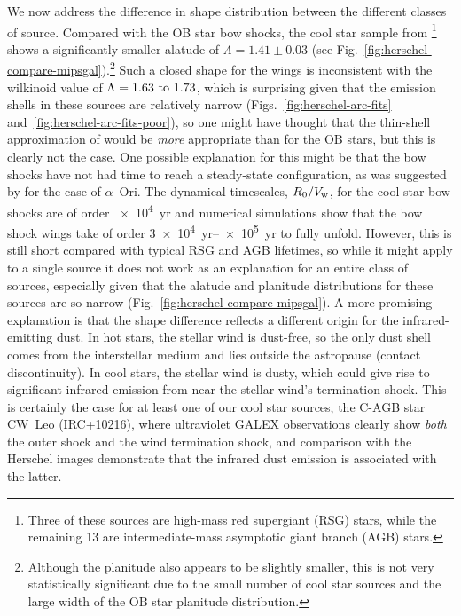 We now address the difference in shape distribution between the
different classes of source.  Compared with the OB star bow shocks,
the cool star sample from \citet{Cox:2012a}\footnote{Three of these
  sources are high-mass red supergiant (RSG) stars, while the
  remaining 13 are intermediate-mass asymptotic giant branch (AGB)
  stars.} shows a significantly smaller alatude of
\(\Lambda = 1.41 \pm 0.03\) (see
Fig.~\ref{fig:herschel-compare-mipsgal}).\footnote{Although the
  planitude also appears to be slightly smaller, this is not very
  statistically significant due to the small number of cool star
  sources and the large width of the OB star planitude distribution.}
Such a closed shape for the wings is inconsistent with the wilkinoid
value of \(\Lambda = \text{\numrange{1.63}{1.73}}\), which is surprising
given that the emission shells in these sources are relatively narrow
(Figs.~\ref{fig:herschel-arc-fits}
and~\ref{fig:herschel-arc-fits-poor}), so one might have thought that
the thin-shell approximation of \citet{Wilkin:1996a} would be
\emph{more} appropriate than for the OB stars, but this is clearly not
the case.  One possible explanation for this might be that the bow
shocks have not had time to reach a steady-state configuration, as was
suggested by \citet{Mohamed:2012a} for the case of \(\alpha\)~Ori.  The
dynamical timescales, \(R_0 / V_{\text{w}}\), for the cool star bow shocks
are of order \SI{e4}{yr} and numerical simulations \citetext{e.g.,
  Fig.~11 of \citealp{Mohamed:2012a} and Fig.~2 of
  \citealp{van-Marle:2014a}} show that the bow shock wings take of
order \SIrange{3e4}{e5}{yr} to fully unfold.  However, this is still
short compared with typical RSG and AGB lifetimes, so while it might
apply to a single source it does not work as an explanation for an
entire class of sources, especially given that the alatude and
planitude distributions for these sources are so narrow
(Fig.~\ref{fig:herschel-compare-mipsgal}).  A more promising
explanation is that the shape difference reflects a different origin
for the infrared-emitting dust.  In hot stars, the stellar wind is
dust-free, so the only dust shell comes from the interstellar medium
and lies outside the astropause (contact discontinuity).  In cool
stars, the stellar wind is dusty, which could give rise to significant
infrared emission from near the stellar wind's termination shock.
This is certainly the case for at least one of our cool star sources,
the C-AGB star CW~Leo (IRC+10216), where ultraviolet GALEX
observations \citep{Sahai:2010a} clearly show \emph{both} the outer
shock and the wind termination shock, and comparison with the Herschel
images demonstrate that the infrared dust emission is associated with
the latter.


